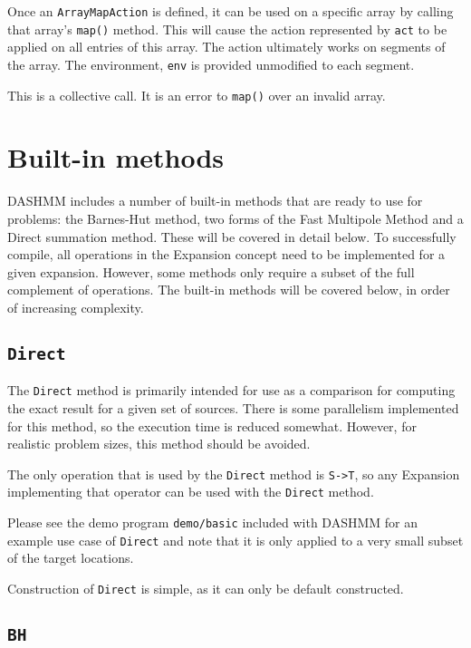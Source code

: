 Once an {\tt ArrayMapAction} is defined, it can be used on a specific array by
calling that array's {\tt map()} method. This will cause the action represented
by {\tt act} to be applied on all entries of this array. The action ultimately
works on segments of the array. The environment, {\tt env} is provided
unmodified to each segment.

This is a collective call. It is an error to {\tt map()} over an invalid array.

\section{Built-in methods}
\label{sec:bi-met}

DASHMM includes a number of built-in methods that are ready to use for
problems: the Barnes-Hut method, two forms of the Fast Multipole Method and
a Direct summation method. These will be covered in detail below. To
successfully compile, all operations in the Expansion concept need to be
implemented for a given expansion. However, some methods only require a
subset of the full complement of operations. The built-in methods will be
covered below, in order of increasing complexity.

\subsection{{\tt Direct}}

The {\tt Direct} method is primarily intended for use as a comparison for
computing
the exact result for a given set of sources. There is some parallelism
implemented for this method, so the execution time is reduced somewhat.
However, for realistic problem sizes, this method should be avoided.

The only operation that is used by the {\tt Direct} method is
{\tt S->T},
so any Expansion implementing that operator can be used with the {\tt Direct}
method.


Please see the demo program {\tt demo/basic} included with DASHMM for an example
use case of {\tt Direct} and note that it is only applied to a very small subset
of the target locations.

Construction of {\tt Direct} is simple, as it can only be default constructed.

\subsection{{\tt BH}}

